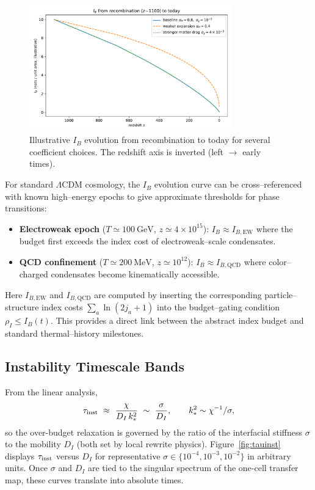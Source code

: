 \documentclass[11pt]{article}
\theoremstyle{plain}
\theoremstyle{definition}
\begin{document}
\begin{figure}[h]
  \centering
  \includegraphics[width=0.78\textwidth]{ibudget_example_curves.pdf}
  \caption{Illustrative $I_B$ evolution from recombination to today for several coefficient choices. The redshift axis is inverted (left $\to$ early times).}
  \label{fig:ibudget}
\end{figure}
For standard $\Lambda$CDM cosmology, the $I_B$ evolution curve can be cross–referenced with known high–energy epochs to give approximate thresholds for phase transitions:

\begin{itemize}
  \item \textbf{Electroweak epoch} ($T\simeq 100\ \mathrm{GeV}$, $z\simeq 4\times 10^{15}$): $I_B \approx I_{B,\mathrm{EW}}$ where the budget first exceeds the index cost of electroweak–scale condensates.
  \item \textbf{QCD confinement} ($T\simeq 200\ \mathrm{MeV}$, $z\simeq 10^{12}$): $I_B \approx I_{B,\mathrm{QCD}}$ where color–charged condensates become kinematically accessible.
\end{itemize}

Here $I_{B,\mathrm{EW}}$ and $I_{B,\mathrm{QCD}}$ are computed by inserting the corresponding particle–structure index costs $\sum_a\ln(2j_a+1)$ into the budget–gating condition $\rho_I\le I_B(t)$. This provides a direct link between the abstract index budget and standard thermal–history milestones.

\subsection{Instability Timescale Bands}
From the linear analysis,
\[
  \tau_{\rm inst}\ \approx\ \frac{\chi}{D_I\,k_\ast^2}\ \sim\ \frac{\sigma}{D_I},
  \qquad
  k_\ast^2 \sim \chi^{-1}/\sigma,
\]
so the over-budget relaxation is governed by the ratio of the interfacial stiffness $\sigma$ to the mobility $D_I$ (both set by local rewrite physics). Figure~\ref{fig:tauinst} displays $\tau_{\rm inst}$ versus $D_I$ for representative $\sigma\in\{10^{-4},10^{-3},10^{-2}\}$ in arbitrary units. Once $\sigma$ and $D_I$ are tied to the singular spectrum of the one-cell transfer map, these curves translate into absolute times.
\end{document}
